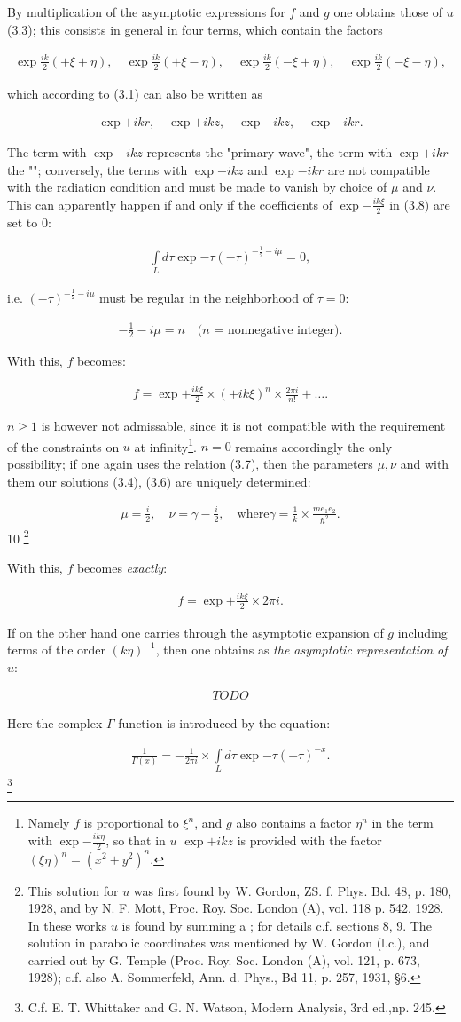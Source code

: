 \documentclass{report}
\newcommand{\nequ}[2]{
\begin{align*}
#1
\tag{#2}
\end{align*}
}
\newcommand{\uequ}[1]{
\begin{align*}
#1
\end{align*}
}
\newcommand{\intX}[1]{\underset{#1}{\int}}
\begin{document}
By multiplication of the asymptotic expressions for $f$ and $g$ one obtains those of $u$ (3.3); this consists in general in four terms, which contain the factors
\uequ{
\exp{\frac{ik}{2}(+\xi + \eta)},\quad
\exp{\frac{ik}{2}(+\xi - \eta)},\quad
\exp{\frac{ik}{2}(-\xi + \eta)},\quad
\exp{\frac{ik}{2}(-\xi - \eta)},
}
which according to (3.1) can also be written as
\uequ{
\exp{+ikr},\quad \exp{+ikz}, \quad \exp{-ikz}, \quad \exp{-ikr}.
}
The term with $\exp{+ikz}$ represents the "primary wave", the term with $\exp{+ikr}$ the ""; conversely, the terms with $\exp{-ikz}$ and $\exp{-ikr}$ are not compatible with the radiation condition and must be made to vanish by choice of $\mu$ and $\nu$. This can apparently happen if and only if the coefficients of $\exp{-\frac{ik\xi}{2}}$ in (3.8) are set to $0$:
\uequ{
\intX{L}d\tau \exp{-\tau}(-\tau)^{-\frac{1}{2}-i\mu} = 0,
}
i.e. $(-\tau)^{-\frac{1}{2}-i\mu}$ must be regular in the neighborhood of $\tau=0$:
\uequ{
-\frac{1}{2} - i\mu = n \quad \text{($n$ = nonnegative integer)}.
}
With this, $f$ becomes:
\uequ{
f=\exp{+\frac{ik\xi}{2}}\times(+ik\xi)^n\times \frac{2\pi i}{n!} + \dots.
}
$n \geq 1$ is however not admissable, since it is not compatible with the requirement of the constraints on $u$ at infinity\footnote{Namely $f$ is proportional to $\xi^n$, and $g$ also contains a factor $\eta^n$ in the term with $\exp{-\frac{ik\eta}{2}}$, so that in $u$ $\exp{+ikz}$ is provided with the factor $(\xi\eta)^n = (x^2 + y^2)^n$.}. $n=0$ remains accordingly the only possibility; if one again uses the relation (3.7), then the parameters $\mu,\nu$ and with them our solutions (3.4), (3.6) are uniquely determined:
\nequ{
\mu=\frac{i}{2},\quad \nu=\gamma - \frac{i}{2},\quad\text{where}
\gamma = \frac{1}{k}\times \frac{m e_1 e_2}{\hbar^2}.
}{3}10
\footnote{This solution for $u$ was first found by W. Gordon, ZS. f. Phys. Bd. 48, p. 180, 1928, and by N. F. Mott, Proc. Roy. Soc. London (A), vol. 118 p. 542, 1928. In these works $u$ is found by summing a ; for details c.f. sections 8, 9. The solution in parabolic coordinates was mentioned by W. Gordon (l.c.), and carried out by G. Temple (Proc. Roy. Soc. London (A), vol. 121, p. 673, 1928); c.f. also A. Sommerfeld, Ann. d. Phys., Bd 11, p. 257, 1931, §6.}

With this, $f$ becomes \textit{exactly}:
\nequ{
f=\exp{+\frac{ik\xi}{2}}\times 2\pi i.
}{3.11}

If on the other hand one carries through the asymptotic expansion of $g$ including terms of the order $(k\eta)^{-1}$, then one obtains as \textit{the asymptotic representation of $u$}:
\nequ{TODO}{3.12}
Here the complex $\Gamma$-function is introduced by the equation:
\nequ{
\frac{1}{\Gamma(x)} = -\frac{1}{2\pi i}\times\intX{L}d\tau \exp{-\tau} (-\tau)^{-x}.
}{3.13}\footnote{C.f. E. T. Whittaker and G. N. Watson, Modern Analysis, 3rd ed.,np. 245.}
\end{document}
